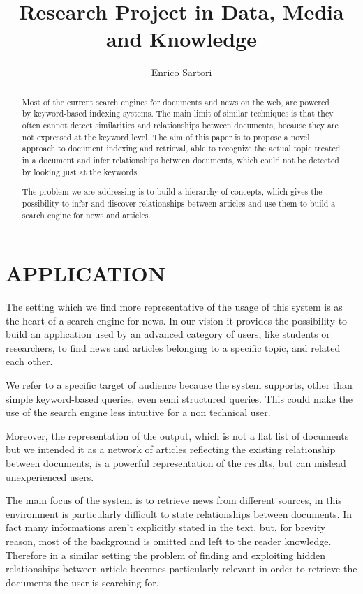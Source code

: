 \documentclass{acm_proc_article-sp-sigmod07}
\begin{document}
\title{Research Project in Data, Media and Knowledge}
\author{Enrico Sartori}

\maketitle

\begin{abstract}
Most of the current search engines for documents and news on the web, are
powered by keyword-based indexing systems. The main limit of similar
techniques is that they often cannot detect similarities and relationships
between documents, because they are not expressed at the keyword level.
The aim of this paper is to propose a novel approach to document indexing
and retrieval, able to recognize the actual topic treated in a document
and infer relationships between documents, which could not be detected by
looking just at the keywords.

The problem we are addressing is to build a hierarchy of concepts, which
gives the possibility to infer and discover relationships between articles
and use them to build a search engine for news and articles.
\end{abstract}

\section{APPLICATION}
The setting which we find more representative of the usage of this system
is as the heart of a search engine for news. In our vision it provides the
possibility to build an application used by an advanced category of users,
like students or researchers, to find news and articles belonging to a
specific topic, and related each other.

We refer to a specific target of audience because the system supports,
other than simple keyword-based queries, even semi structured queries.
This could make the use of the search engine less intuitive for a non
technical user.

Moreover, the representation of the output, which is not a flat list of
documents but we intended it as a network of articles reflecting the
existing relationship between documents, is a powerful representation of
the results, but can mislead unexperienced users.

The main focus of the system is to retrieve news from different sources,
in this environment is particularly difficult to state relationships
between documents. In fact many informations aren't explicitly stated in
the text, but, for brevity reason, most of the background is omitted and
left to the reader knowledge.
Therefore in a similar setting the problem of finding and exploiting
hidden relationships between article becomes particularly relevant in
order to retrieve the documents the user is searching for.
\end{document}
